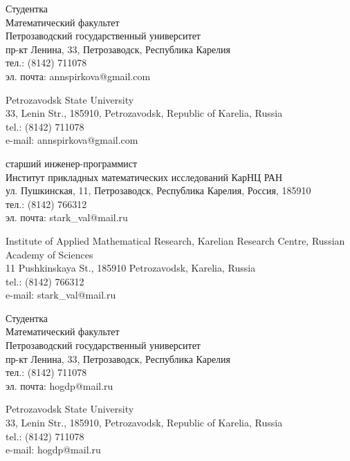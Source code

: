 \documentclass{article}
\begin{document}
\begin{aboutauthors}
Студентка\\
Математический факультет\\ 
Петрозаводский государственный университет\\
пр-кт Ленина, 33, Петрозаводск, Республика Карелия\\
тел.: (8142) 711078\\
эл. почта: annspirkova@gmail.com

\columnbreak

Petrozavodsk State University\\
33, Lenin Str., 185910, Petrozavodsk, Republic of Karelia, Russia\\
tel.: (8142) 711078\\
e-mail: annspirkova@gmail.com
\end{aboutauthors}

\begin{aboutauthors}
старший инженер-программист\\ 
Институт прикладных математических исследований КарНЦ РАН\\ 
ул. Пушкинская, 11, Петрозаводск, Республика Карелия, Россия, 185910\\
тел.: (8142) 766312\\
эл. почта: stark\_val@mail.ru

\columnbreak

Institute of Applied Mathematical Research, Karelian Research Centre, Russian Academy of Sciences\\
11 Pushkinskaya St., 185910 Petrozavodsk, Karelia, Russia\\
tel.: (8142) 766312\\
e-mail: stark\_val@mail.ru 
\end{aboutauthors}

\begin{aboutauthors}
Студентка\\
Математический факультет\\ 
Петрозаводский государственный университет\\
пр-кт Ленина, 33, Петрозаводск, Республика Карелия\\
тел.: (8142) 711078\\
эл. почта: hogdp@mail.ru

\columnbreak

Petrozavodsk State University\\
33, Lenin Str., 185910, Petrozavodsk, Republic of Karelia, Russia\\
tel.: (8142) 711078\\
e-mail: hogdp@mail.ru
\end{aboutauthors}
\end{document}
